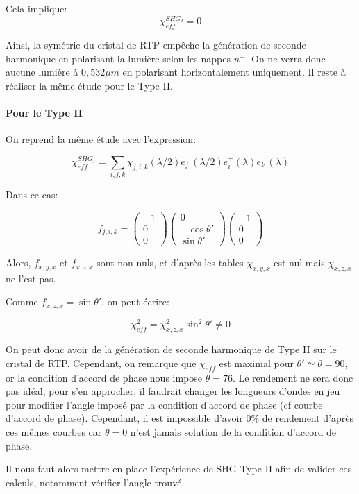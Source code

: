 \documentclass[a4paper,11pt]{report}
\begin{document}
Cela implique:
\[\chi_{eff}^{SHG_I}=0\]

Ainsi, la symétrie du cristal de RTP empêche la génération de seconde harmonique en polarisant la lumière selon les nappes $n^+$. On ne verra donc aucune lumière à $0,532\mu m$ en polarisant horizontalement uniquement. Il reste à réaliser la même étude pour le Type II.

\paragraph{Pour le Type II}

On reprend la même étude avec l'expression: 

\[\chi_{eff}^{SHG_I}=\sum_{i,j,k}\chi_{j,i,k}(\lambda/2)e^-_j(\lambda/2)e^+_i(\lambda)e^-_k(\lambda)\]

Dans ce cas:

\[f_{j,i,k}=\begin{pmatrix}-1\\0\\0\end{pmatrix}\begin{pmatrix}0\\-\cos\theta'\\\sin\theta'\end{pmatrix}\begin{pmatrix}-1\\0\\0\end{pmatrix}\]

Alors, $f_{x,y,x}$ et $f_{x,z,x}$ sont non nuls, et d'après les tables $\chi_{x,y,x}$ est nul mais $\chi_{x,z,x}$ ne l'est pas. 

Comme $f_{x,z,x}=\sin\theta'$, on peut écrire:

\[\chi_{eff}^2=\chi_{x,z,x}^2\sin^2\theta'\neq 0\]

On peut donc avoir de la génération de seconde harmonique de Type II sur le cristal de RTP. Cependant, on remarque que $\chi_{eff}$ est maximal pour $\theta'\simeq\theta=90$\textdegree, or la condition d'accord de phase nous impose $\theta=76$\textdegree. Le rendement ne sera donc pas idéal, pour s'en approcher, il faudrait changer les longueurs d'ondes en jeu pour modifier l'angle imposé par la condition d'accord de phase (cf courbe d'accord de phase). Cependant, il est impossible d'avoir 0\% de rendement d'après ces mêmes courbes car $\theta=0$ n'est jamais solution de la condition d'accord de phase.

Il nous faut alors mettre en place l'expérience de SHG Type II afin de valider ces calculs, notamment vérifier l'angle trouvé.
\end{document}
